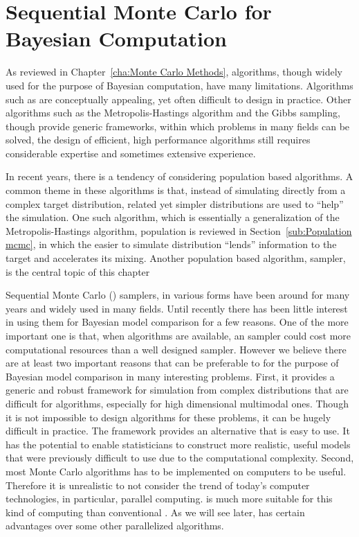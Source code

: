 \chapter{Sequential Monte Carlo for Bayesian Computation}
\label{cha:Sequential Monte Carlo for Bayesian Computation}

As reviewed in Chapter~\ref{cha:Monte Carlo Methods}, \mcmc algorithms, though widely used for the purpose of Bayesian computation, have many limitations. Algorithms such as \rjmcmc are conceptually appealing, yet often difficult to design in practice. Other algorithms such as the Metropolis-Hastings algorithm and the Gibbs sampling, though provide generic frameworks, within which problems in many fields can be solved, the design of efficient, high performance algorithms still requires considerable expertise and sometimes extensive experience.

In recent years, there is a tendency of considering population based algorithms. A common theme in these algorithms is that, instead of simulating directly from a complex target distribution, related yet simpler distributions are used to ``help'' the simulation. One such algorithm, which is essentially a generalization of the Metropolis-Hastings algorithm, population \mcmc is reviewed in Section~\ref{sub:Population mcmc}, in which the easier to simulate distribution ``lends'' information to the target and accelerates its mixing. Another population based algorithm, \smc sampler, is the central topic of this chapter

Sequential Monte Carlo (\smc) samplers, in various forms have been around for many years and widely used in many fields. Until recently there has been little interest in using them for Bayesian model comparison for a few reasons. One of the more important one is that, when \mcmc algorithms are available, an \smc sampler could cost more computational resources than a well designed \mcmc sampler. However we believe there are at least two important reasons that \smc can be preferable to \mcmc for the purpose of Bayesian model comparison in many interesting problems. First, it provides a generic and robust framework for simulation from complex distributions that are difficult for \mcmc algorithms, especially for high dimensional multimodal ones. Though it is not impossible to design \mcmc algorithms for these problems, it can be hugely difficult in practice. The \smc framework provides an alternative that is easy to use. It has the potential to enable statisticians to construct more realistic, useful models that were previously difficult to use due to the computational complexity. Second, most Monte Carlo algorithms has to be implemented on computers to be useful. Therefore it is unrealistic to not consider the trend of today's computer technologies, in particular, parallel computing. \smc is much more suitable for this kind of computing than conventional \mcmc. As we will see later, \smc has certain advantages over some other parallelized algorithms.

